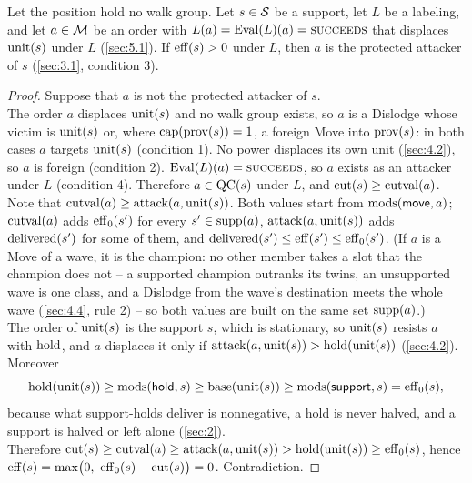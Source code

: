 \documentclass[12pt,a4paper]{article}
\begin{document}
\begin{lemma}\label{lem:L4}
Let the position hold no walk group.
Let $s \in \mathcal{S}$ be a support, let $L$ be a labeling, and let $a \in \mathcal{M}$ be an order with $L(a) = \operatorname{Eval}(L)(a) = \textsc{succeeds}$ that displaces $\operatorname{unit}(s)$ under $L$ (\cref{sec:5.1}).
If $\operatorname{eff}(s) > 0$ under $L$, then $a$ is the protected attacker of $s$ (\cref{sec:3.1}, condition 3).
\end{lemma}
\begin{proof}
Suppose that $a$ is not the protected attacker of $s$.\\
The order $a$ displaces $\operatorname{unit}(s)$ and no walk group exists, so $a$ is a Dislodge whose victim is $\operatorname{unit}(s)$ or, where $\operatorname{cap}(\operatorname{prov}(s)) = 1$, a foreign Move into $\operatorname{prov}(s)$: in both cases $a$ targets $\operatorname{unit}(s)$ (condition 1).
No power displaces its own unit (\cref{sec:4.2}), so $a$ is foreign (condition 2).
$\operatorname{Eval}(L)(a) = \textsc{succeeds}$, so $a$ exists as an attacker under $L$ (condition 4).
Therefore $a \in \operatorname{QC}(s)$ under $L$, and $\operatorname{cut}(s) \ge \operatorname{cutval}(a)$.\\
Note that $\operatorname{cutval}(a) \ge \operatorname{attack}(a, \operatorname{unit}(s))$.
Both values start from $\operatorname{mods}(\mathsf{move}, a)$; $\operatorname{cutval}(a)$ adds $\operatorname{eff}_0(s')$ for every $s' \in \operatorname{supp}(a)$, $\operatorname{attack}(a, \operatorname{unit}(s))$ adds $\operatorname{delivered}(s')$ for some of them, and $\operatorname{delivered}(s') \le \operatorname{eff}(s') \le \operatorname{eff}_0(s')$.
(If $a$ is a Move of a wave, it is the champion: no other member takes a slot that the champion does not -- a supported champion outranks its twins, an unsupported wave is one class, and a Dislodge from the wave's destination meets the whole wave (\cref{sec:4.4}, rule 2) -- so both values are built on the same set $\operatorname{supp}(a)$.)\\
The order of $\operatorname{unit}(s)$ is the support $s$, which is stationary, so $\operatorname{unit}(s)$ resists $a$ with $\operatorname{hold}$, and $a$ displaces it only if $\operatorname{attack}(a, \operatorname{unit}(s)) > \operatorname{hold}(\operatorname{unit}(s))$ (\cref{sec:4.2}).
Moreover
\[
\operatorname{hold}(\operatorname{unit}(s)) \ge \operatorname{mods}(\mathsf{hold}, s) \ge \operatorname{base}(\operatorname{unit}(s)) \ge \operatorname{mods}(\mathsf{support}, s) = \operatorname{eff}_0(s),
\]
because what support-holds deliver is nonnegative, a hold is never halved, and a support is halved or left alone (\cref{sec:2}).\\
Therefore $\operatorname{cut}(s) \ge \operatorname{cutval}(a) \ge \operatorname{attack}(a, \operatorname{unit}(s)) > \operatorname{hold}(\operatorname{unit}(s)) \ge \operatorname{eff}_0(s)$, hence $\operatorname{eff}(s) = \max\bigl(0,\ \operatorname{eff}_0(s) - \operatorname{cut}(s)\bigr) = 0$.
Contradiction.
\end{proof}
\end{document}
